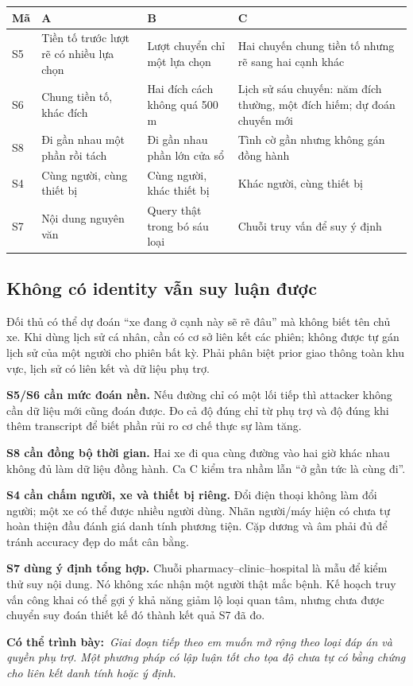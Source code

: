 \documentclass[10pt,a4paper]{article}
\newcommand{\say}[1]{\par\textbf{Có thể trình bày:}\ \textit{#1}\par}
\begin{document}
\begin{longtable}{@{}P{1.4cm}P{5.0cm}P{5.0cm}P{4.4cm}@{}}
\toprule Mã & A & B & C\\\midrule
S5 & Tiền tố trước lượt rẽ có nhiều lựa chọn & Lượt chuyển chỉ một lựa chọn & Hai chuyến chung tiền tố nhưng rẽ sang hai cạnh khác\\[4pt]
S6 & Chung tiền tố, khác đích & Hai đích cách không quá 500 m & Lịch sử sáu chuyến: năm đích thường, một đích hiếm; dự đoán chuyến mới\\[4pt]
S8 & Đi gần nhau một phần rồi tách & Đi gần nhau phần lớn cửa sổ & Tình cờ gần nhưng không gán đồng hành\\[4pt]
S4 & Cùng người, cùng thiết bị & Cùng người, khác thiết bị & Khác người, cùng thiết bị\\[4pt]
S7 & Nội dung nguyên văn & Query thật trong bó sáu loại & Chuỗi truy vấn để suy ý định\\
\bottomrule
\end{longtable}

\subsection*{Không có identity vẫn suy luận được}
Đối thủ có thể dự đoán ``xe đang ở cạnh này sẽ rẽ đâu'' mà không biết tên chủ xe. Khi dùng lịch sử cá nhân, cần có cơ sở liên kết các phiên; không được tự gán lịch sử của một người cho phiên bất kỳ. Phải phân biệt prior giao thông toàn khu vực, lịch sử có liên kết và dữ liệu phụ trợ.

\textbf{S5/S6 cần mức đoán nền.} Nếu đường chỉ có một lối tiếp thì attacker không cần dữ liệu mới cũng đoán được. Đo cả độ đúng chỉ từ phụ trợ và độ đúng khi thêm transcript để biết phần rủi ro cơ chế thực sự làm tăng.

\textbf{S8 cần đồng bộ thời gian.} Hai xe đi qua cùng đường vào hai giờ khác nhau không đủ làm dữ liệu đồng hành. Ca C kiểm tra nhầm lẫn ``ở gần tức là cùng đi''.

\textbf{S4 cần chấm người, xe và thiết bị riêng.} Đổi điện thoại không làm đổi người; một xe có thể được nhiều người dùng. Nhãn người/máy hiện có chưa tự hoàn thiện đầu đánh giá danh tính phương tiện. Cặp dương và âm phải đủ để tránh accuracy đẹp do mất cân bằng.

\textbf{S7 dùng ý định tổng hợp.} Chuỗi pharmacy--clinic--hospital là mẫu để kiểm thử suy nội dung. Nó không xác nhận một người thật mắc bệnh. Kế hoạch truy vấn công khai có thể gợi ý khả năng giảm lộ loại quan tâm, nhưng chưa được chuyển suy đoán thiết kế đó thành kết quả S7 đã đo.
\say{Giai đoạn tiếp theo em muốn mở rộng theo loại đáp án và quyền phụ trợ. Một phương pháp có lập luận tốt cho tọa độ chưa tự có bằng chứng cho liên kết danh tính hoặc ý định.}
\end{document}
